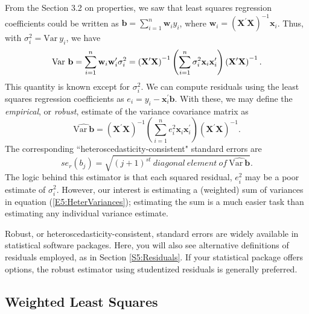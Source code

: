 From the Section 3.2 on properties, we saw that least squares
regression coefficients could be written as $ \mathbf{b} =
\sum_{i=1}^n \mathbf{w}_i y_i $, where $\mathbf{w}_i =\left(
\mathbf{X}^{\prime}\mathbf{X}\right)^{-1} \mathbf{x}_i$. Thus, with
$\sigma_i^2 = \mathrm{Var~} y_i$, we have
\begin{equation}\label{E5:HeterVariances}
\mathrm{Var~}\mathbf{b} = \sum_{i=1}^n \mathbf{w}_i
\mathbf{w}_i^{\prime} \sigma_i^2  \\
=\left( \mathbf{X}^{\prime}\mathbf{X}\right)^{-1} \left(
\sum_{i=1}^n \sigma_i^2 \mathbf{x}_i \mathbf{x}_i^{\prime} \right)
\left( \mathbf{X}^{\prime}\mathbf{X}\right)^{-1}.
\end{equation}
This quantity is known except for $\sigma_i^2$. We can compute
residuals using the least squares regression coefficients as $e_i =
y_i - \mathbf{x}_i^{\prime} \mathbf{b}$. With these, we may define
the \emph{empirical}, or \emph{robust}, estimate of the variance
covariance matrix as
\begin{equation*}
\widehat{\mathrm{Var~}\mathbf{b}} =\left(
\mathbf{X}^{\prime}\mathbf{X}\right)^{-1} \left( \sum_{i=1}^n e_i^2
\mathbf{x}_i \mathbf{x}_i^{\prime} \right) \left(
\mathbf{X}^{\prime}\mathbf{X}\right)^{-1}.
\end{equation*}
The corresponding ``heteroscedasticity-consistent" standard errors
are
\begin{equation}\label{E5:RobustSEs}
se_r(b_j) = \sqrt{(j+1)^{st} ~diagonal~
element~of~\widehat{\mathrm{Var~}\mathbf{b}}}.
\end{equation}
The logic behind this estimator is that each squared residual,
$e_i^2$ may be a poor estimate of $\sigma_i^2$. However, our
interest is estimating a (weighted) sum of variances in equation
(\ref{E5:HeterVariances}); estimating the sum is a much easier task
than estimating any individual variance estimate.

Robust, or heteroscedasticity-consistent, standard errors are widely
available in statistical software packages. Here, you will also see
alternative definitions of residuals employed, as in Section
\ref{S5:Residuals}. If your statistical package offers options, the
robust estimator using studentized residuals is generally preferred.


\subsection{Weighted Least Squares}\label{S5:WeightedLS}

